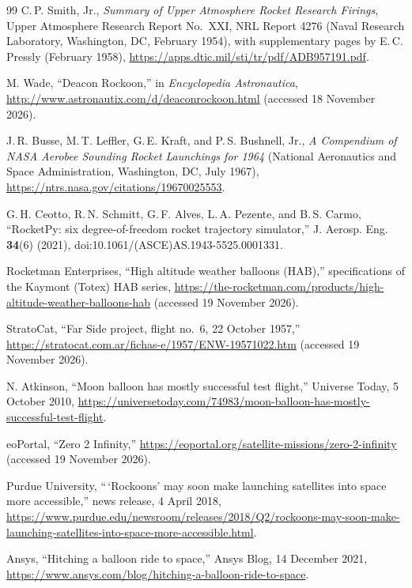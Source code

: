 \documentclass[11pt,a4paper]{article}
\begin{document}
\begin{thebibliography}{99}
 C.\,P. Smith, Jr., \emph{Summary of Upper Atmosphere Rocket Research Firings}, Upper Atmosphere Research Report No.~XXI, NRL Report 4276 (Naval Research Laboratory, Washington, DC, February 1954), with supplementary pages by E.\,C. Pressly (February 1958), \url{https://apps.dtic.mil/sti/tr/pdf/ADB957191.pdf}.

 M. Wade, ``Deacon Rockoon,'' in \emph{Encyclopedia Astronautica}, \url{http://www.astronautix.com/d/deaconrockoon.html} (accessed 18 November 2026).

 J.\,R. Busse, M.\,T. Leffler, G.\,E. Kraft, and P.\,S. Bushnell, Jr., \emph{A Compendium of NASA Aerobee Sounding Rocket Launchings for 1964} (National Aeronautics and Space Administration, Washington, DC, July 1967), \url{https://ntrs.nasa.gov/citations/19670025553}.

 G.\,H. Ceotto, R.\,N. Schmitt, G.\,F. Alves, L.\,A. Pezente, and B.\,S. Carmo, ``RocketPy: six degree-of-freedom rocket trajectory simulator,'' J. Aerosp. Eng. \textbf{34}(6) (2021), doi:10.1061/(ASCE)AS.1943-5525.0001331.

 Rocketman Enterprises, ``High altitude weather balloons (HAB),'' specifications of the Kaymont (Totex) HAB series, \url{https://the-rocketman.com/products/high-altitude-weather-balloons-hab} (accessed 19 November 2026).

 StratoCat, ``Far Side project, flight no.~6, 22 October 1957,'' \url{https://stratocat.com.ar/fichas-e/1957/ENW-19571022.htm} (accessed 19 November 2026).

 N. Atkinson, ``Moon balloon has mostly successful test flight,'' Universe Today, 5 October 2010, \url{https://universetoday.com/74983/moon-balloon-has-mostly-successful-test-flight}.

 eoPortal, ``Zero 2 Infinity,'' \url{https://eoportal.org/satellite-missions/zero-2-infinity} (accessed 19 November 2026).

 Purdue University, ``\,`Rockoons' may soon make launching satellites into space more accessible,'' news release, 4 April 2018, \url{https://www.purdue.edu/newsroom/releases/2018/Q2/rockoons-may-soon-make-launching-satellites-into-space-more-accessible.html}.

 Ansys, ``Hitching a balloon ride to space,'' Ansys Blog, 14 December 2021, \url{https://www.ansys.com/blog/hitching-a-balloon-ride-to-space}.


\end{thebibliography}
\end{document}
